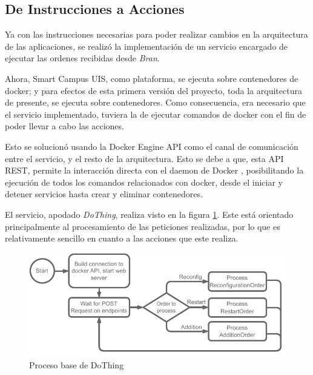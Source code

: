 \subsection{De Instrucciones a Acciones}




Ya con las instrucciones necesarias para poder realizar cambios en la arquitectura de las aplicaciones, se realizó la implementación de un servicio encargado de ejecutar las ordenes recibidas desde \textit{Bran}.

Ahora, Smart Campus UIS, como plataforma, se ejecuta sobre contenedores de docker; y para efectos de esta primera versión del proyecto, toda la arquitectura de presente, se ejecuta sobre contenedores. Como consecuencia, era necesario que el servicio implementado, tuviera la de ejecutar comandos de docker con el fin de poder llevar a cabo las acciones.

Esto se solucionó usando la Docker Engine API como el canal de comunicación entre el servicio, y el resto de la arquitectura. Esto se debe a que, esta API REST, permite la interacción directa con el daemon de Docker \cite{docker}, posibilitando la ejecución de todos los comandos relacionados con docker, desde el iniciar y detener servicios hasta crear y eliminar contenedores.

El servicio, apodado \textit{DoThing}, realiza visto en la figura \ref{fig:DoThing}. Este está orientado principalmente al procesamiento de las peticiones realizadas, por lo que es relativamente sencillo en cuanto a las acciones que este realiza. 

\begin{figure}[ht]
    \centering
    \caption{Proceso base de DoThing}
    \label{fig:DoThing}
    \includegraphics[width=0.75\linewidth]{images/DoThingProcess.pdf}
\end{figure}

